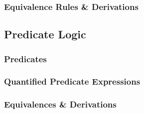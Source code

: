 \documentclass[english, 11pt]{article}
\begin{document}
\subsubsection{Equivalence Rules \& Derivations}
\subsection{Predicate Logic}
\subsubsection{Predicates}
\subsubsection{Quantified Predicate Expressions}
\subsubsection{Equivalences \& Derivations}






 




  
\end{document}
